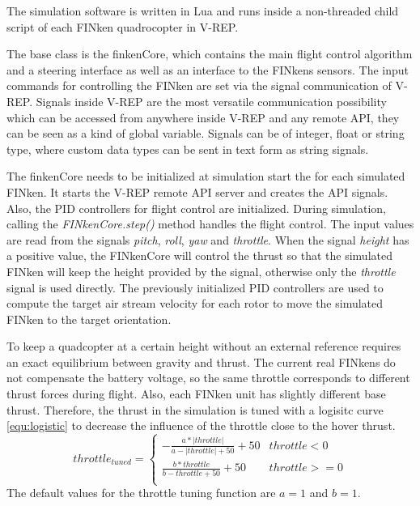 The simulation software is written in Lua and runs inside a non-threaded child script of each FINken quadrocopter in V-REP.  

The base class is the finkenCore, which contains the main flight control algorithm and a steering interface as well as an interface to the FINkens sensors.
The input commands for controlling the FINken are set via the signal communication of V-REP. Signals inside V-REP are the most versatile communication possibility which can be accessed from anywhere inside V-REP and any remote API, they can be seen as a kind of global variable. Signals can be of integer, float or string type, where custom data types can be sent in text form as string signals. 

The finkenCore needs to be initialized at simulation start the for each simulated FINken. It starts the V-REP remote API server and creates the API signals. Also, the \gls{PID} controllers for flight control are initialized. 
During simulation, calling the \textit{FINkenCore.step()} method handles the flight control. The input values are read from the signals \textit{pitch}, \textit{roll}, \textit{yaw} and \textit{throttle}. When the signal \textit{height} has a positive value, the FINkenCore will control the thrust so that the simulated FINken will keep the height provided by the signal, otherwise only the \textit{throttle} signal is used directly. The previously initialized \gls{PID} controllers are used to compute the target air stream velocity for each rotor to move the simulated FINken to the target orientation.

To keep a quadcopter at a certain height without an external reference requires an exact equilibrium between gravity and thrust. The current real FINkens do not compensate the battery voltage, so the same throttle corresponds to different thrust forces during flight. Also, each FINken unit has slightly different base thrust. Therefore, the thrust in the simulation is tuned with a logisitc curve \ref{equ:logistic} to decrease the influence of the throttle close to the hover thrust. 
\begin{equation}
	throttle_{tuned} = \begin{cases}
		-\frac{a * |throttle|}{a - |throttle| + 50} + 50 & throttle < 0 \\
		\frac{b * throttle}{b - throttle + 50} + 50 & throttle >= 0\\
	\end{cases}
\label{equ:logistic}
\end{equation}
The default values for the throttle tuning function are  $a = 1$ and $b = 1$. 


